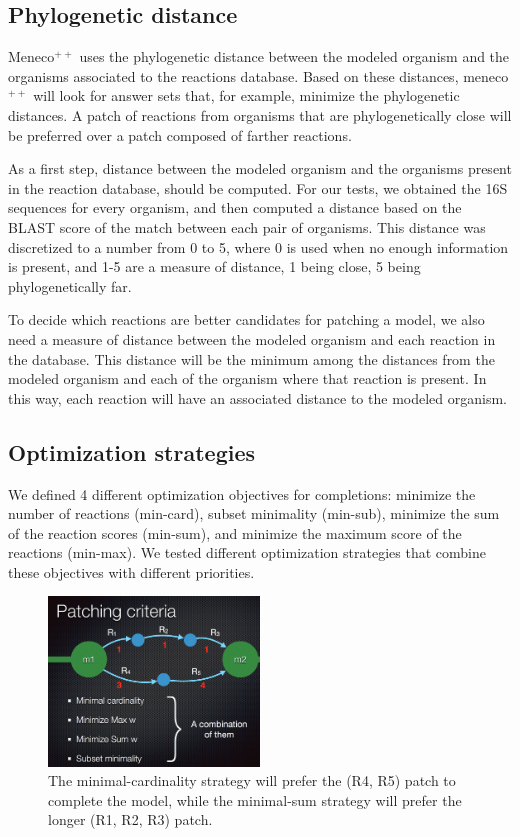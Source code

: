 \documentclass{article}
\newcommand{\Meneco}{Meneco$^{++}$\xspace}
\newcommand{\meneco}{meneco$^{++}$\xspace}
\begin{document}
\subsection{Phylogenetic distance}

\Meneco uses the phylogenetic distance between the modeled organism and the organisms associated to the reactions database. Based on these distances, \meneco will look for answer sets that, for example, minimize the phylogenetic distances. A patch of reactions from organisms that are phylogenetically close will be preferred over a patch composed of farther reactions.

As a first step, distance between the modeled organism and the organisms present in the reaction database, should be computed. For our tests, we obtained the 16S sequences for every organism, and then computed a distance based on the BLAST score of the match between each pair of organisms. This distance was discretized to a number from 0 to 5, where 0 is used when no enough information is present, and 1-5 are a measure of distance, 1 being close, 5 being phylogenetically far.

To decide which reactions are better candidates for patching a model, we also need a measure of distance between the modeled organism and each reaction in the database. This distance will be the minimum among the distances from the modeled organism and each of the organism where that reaction is present. In this way, each reaction will have an associated distance to the modeled organism.

\subsection{Optimization strategies}

We defined 4 different optimization objectives for completions: 
minimize the number of reactions (min-card),
subset minimality (min-sub), 
minimize the sum of the reaction scores (min-sum), and  
minimize the maximum score of the reactions (min-max).
We tested different optimization strategies that combine these objectives with different priorities.

\begin{figure}[tb]
	\begin{center}
		\includegraphics[width=0.5\textwidth]{patchingStrategies.png}
	\end{center}
	\caption[]{The minimal-cardinality strategy will prefer the (R4, R5) patch to complete the model, while the minimal-sum strategy will prefer the longer (R1, R2, R3) patch.}
	\label{fig:figure1}
\end{figure}
\end{document}
